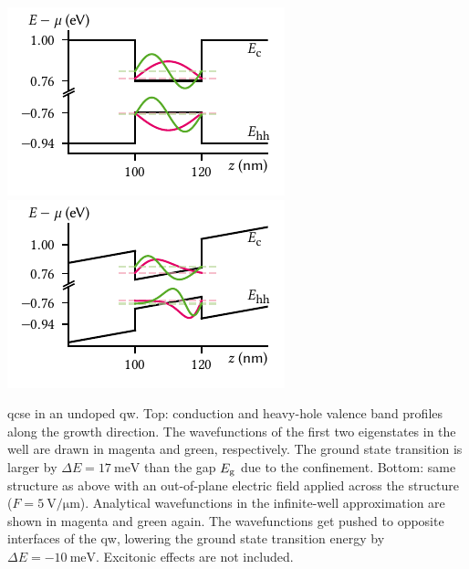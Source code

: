 \begin{marginfigure}
    \centering
    \includegraphics{img/pdf/experiment/qw_undoped_0V}
    \includegraphics{img/pdf/experiment/qw_undoped_1V}
    \caption[]{
        \Gls{qcse} in an undoped \acrshort{qw}.
        Top: conduction and heavy-hole valence band profiles along the growth direction.
        The wavefunctions of the first two eigenstates in the well are drawn in magenta and green, respectively.
        The ground state transition is larger by $\Delta E = \qty{17}{\milli\electronvolt}$ than the gap $E_{\mathrm{g}}$ due to the confinement.
        Bottom: same structure as above with an out-of-plane electric field applied across the structure ($F=\qty{5}{\volt\per\micro\meter}$).
        Analytical wavefunctions in the infinite-well approximation are shown in magenta and green again.
        The wavefunctions get pushed to opposite interfaces of the \acrshort{qw}, lowering the ground state transition energy by $\Delta E = -\qty{10}{\milli\electronvolt}$.
        Excitonic effects are not included.
    }
    \label{fig:exp:theory:qw_tilted}
\end{marginfigure}

